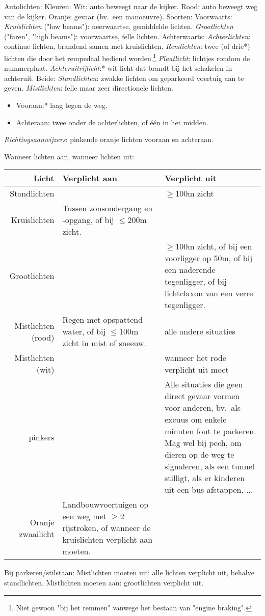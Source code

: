 \begin{outline}
\1 Autolichten:
	\2 Kleuren:
		\3 Wit: auto beweegt naar de kijker.
		\3 Rood: auto beweegt weg van de kijker.
		\3 Oranje: gevaar (bv.\ een manoeuvre).
	\2 Soorten:
		\3 Voorwaarts:
			\4 \emph{Kruislichten} ("low beams"): neerwaartse, gemiddelde lichten.
			\4 \emph{Grootlichten} ("faren", "high beams"): voorwaartse, felle lichten.
		\3 Achterwaarts:
			\4 \emph{Achterlichten}: continue lichten, brandend samen met kruislichten.
			\4 \emph{Remlichten}: twee (of drie*) lichten die door het rempedaal bediend worden.\footnote{Niet gewoon "bij het remmen" vanwege het bestaan van "engine braking".}
			\4 \emph{Plaatlicht}: lichtjes rondom de nummerplaat.
			\4 \emph{Achteruitrijlicht}:* wit licht dat brandt bij het schakelen in achteruit.
		\3 Beide:
			\4 \emph{Standlichten}: zwakke lichten om geparkeerd voertuig aan te geven.
			\4 \emph{Mistlichten}: felle maar zeer directionele lichten.
			\begin{itemize}
				\item Vooraan:* laag tegen de weg.
				\item Achteraan: twee onder de achterlichten, of één in het midden.
			\end{itemize}
			\4 \emph{Richtingsaanwijzers}: pinkende oranje lichten vooraan en achteraan.

\1 Wanneer lichten aan, wanneer lichten uit:
\begin{center}
\begin{tabular}{r|p{6cm}|p{6cm}}
	\bfseries Licht & \bfseries Verplicht aan & \bfseries Verplicht uit \\\hline\hline
	Standlichten    & & $\geq$100m zicht \\\hdashline
	Kruislichten    & Tussen zonsondergang en -opgang, of bij $\leq$200m zicht. &   \\\hdashline
	Grootlichten    & & $\geq$100m zicht, of bij een voorligger op 50m, of bij een naderende tegenligger, of bij lichtclaxon van een verre tegenligger.   \\\hdashline
	Mistlichten (rood) & Regen met opspattend water, of bij $\leq$100m zicht in mist of sneeuw. & alle andere situaties \\\hdashline
	Mistlichten (wit)  &  & wanneer het rode verplicht uit moet \\\hdashline
	4 pinkers       & & Alle situaties die geen direct gevaar vormen voor anderen, bv.\ als excuus om enkele minuten fout te parkeren. Mag wel bij pech, om dieren op de weg te signaleren, als een tunnel stilligt, als er kinderen uit een bus afstappen, ...  \\\hdashline
	Oranje zwaailicht & Landbouwvoertuigen op een weg met $\geq$2 rijstroken, of wanneer de kruislichten verplicht aan moeten. & 
\end{tabular}
\end{center}
	\2 Bij parkeren/stilstaan:
		\3 Mistlichten moeten uit: alle lichten verplicht uit, behalve standlichten. 
		\3 Mistlichten moeten aan: grootlichten verplicht uit.


\end{outline}
